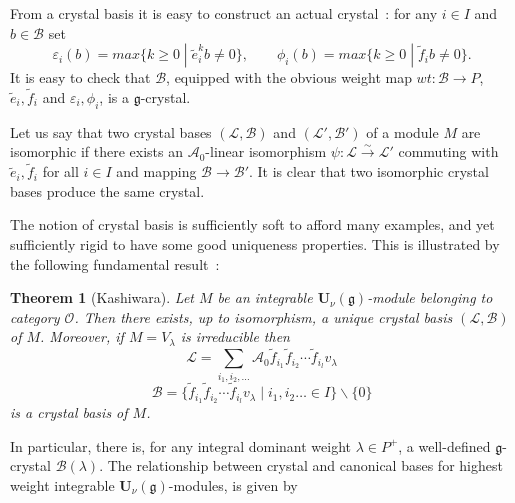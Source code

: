 \documentclass[a4paper,10pt]{amsart}
\def\U{\mathbf{U}}
\def\g{\mathfrak{g}}
\newtheorem{theo}{\bf{Theorem}}[section]
\numberwithin{equation}{section}
\begin{document}
 \vspace{.1in}
 
 From a crystal basis it is easy to construct an actual crystal~: for any $i \in I$ and $b \in \mathcal{B}$ set
 $$\varepsilon_i(b)=max\{k \geq 0\;|\; \tilde{e}_i^kb \neq 0\}, \qquad \phi_i(b)=max\{k \geq 0\;|\; \tilde{f}_ib \neq 0\}.$$
 It is easy to check that $\mathcal{B}$, equipped with the obvious weight map $wt: \mathcal{B} \to  P$, $\tilde{e}_i, \tilde{f}_i$ and $\varepsilon_i, \phi_i$, is a $\g$-crystal.
 
 \vspace{.1in}
 
 Let us say that two crystal bases $(\mathcal{L}, \mathcal{B})$ and $(\mathcal{L}', \mathcal{B}')$ of a module $M$ are isomorphic if there exists an $\mathcal{A}_0$-linear isomorphism $\psi:\mathcal{L} \stackrel{\sim}{\to} \mathcal{L}'$ commuting with $\tilde{e}_i, \tilde{f}_i$ for all $i \in I$ and mapping $\mathcal{B} \to \mathcal{B}'$. It is clear that two isomorphic crystal bases produce the same crystal.
 
 \vspace{.1in}
 
The notion of crystal basis is sufficiently soft to afford many examples, and yet sufficiently rigid to have some good uniqueness properties. This is illustrated by the following fundamental result~:

\vspace{.1in}

\begin{theo}[Kashiwara] Let $M$ be an integrable $\U_{\nu}(\g)$-module belonging to category $\mathcal{O}$. Then there exists, up to isomorphism, a unique crystal basis $(\mathcal{L},\mathcal{B})$ of $M$. Moreover, if $M=V_\lambda$ is irreducible then
$$\mathcal{L}=\sum_{i_1, i_2, \ldots} \mathcal{A}_{0} \tilde{f}_{i_1} \tilde{f}_{i_2} \cdots \tilde{f}_{i_l} v_{\lambda}$$
$$\mathcal{B}=\big\{ \tilde{f}_{i_1} \tilde{f}_{i_2} \cdots \tilde{f}_{i_l} v_{\lambda}\;|\; i_1, i_2 \ldots \in I\big\} \backslash \{0\}$$
is a crystal basis of $M$.
\end{theo}

\vspace{.1in}

In particular, there is, for any integral dominant weight $\lambda \in P^+$, a well-defined $\g$-crystal $\mathcal{B}({\lambda})$. The relationship between crystal and canonical bases for highest weight integrable $\U_{\nu}(\g)$-modules, is given by
\end{document}
